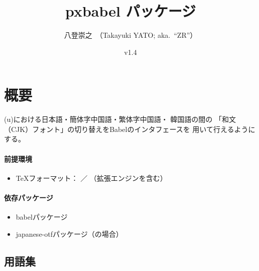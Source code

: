 \documentclass[uplatex,dvipdfmx,a4paper]{jsarticle}
\newcommand{\PkgVersion}{1.4}
\newcommand{\PkgDate}{2023/02/25}
\newcommand{\Pkg}[1]{\textsf{#1}}
\begin{document}
\title{\Pkg{pxbabel} パッケージ}
\author{八登崇之\ （Takayuki YATO; aka.~``ZR''）}
\date{v\PkgVersion \quad [\PkgDate]}
\maketitle

\section{概要}
\label{sec:Overview}

{(u)\pLaTeX}における日本語・簡体字中国語・繁体字中国語・
韓国語の間の
「和文（CJK）フォント」の切り替えをBabelのインタフェースを
用いて行えるようにする。

\paragraph{前提環境}

\begin{itemize}
\item {\TeX}フォーマット： {\pLaTeX}／{\upLaTeX}
  （拡張エンジンを含む）
\end{itemize}

\paragraph{依存パッケージ}

\begin{itemize}
\item \Pkg{babel}パッケージ
\item \Pkg{japanese-otf}パッケージ（{\pLaTeX}の場合）
\end{itemize}

\subsection{用語集}
\label{ssec:terminology}
\end{document}
